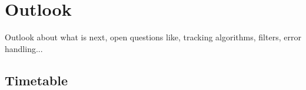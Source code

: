 \chapter{Outlook}
Outlook about what is next, open questions like, tracking algorithms, filters, error handling...


\section{Timetable}

\begin{comment}

\end{comment}
